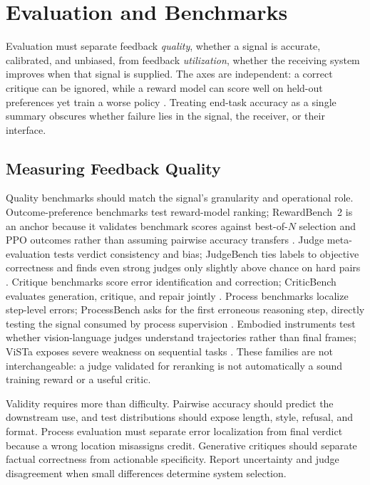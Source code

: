 \section{Evaluation and Benchmarks}
\label{sec:evaluation}

Evaluation must separate feedback \emph{quality}, whether a signal is accurate, calibrated, and unbiased, from feedback \emph{utilization}, whether the receiving system improves when that signal is supplied. The axes are independent: a correct critique can be ignored, while a reward model can score well on held-out preferences yet train a worse policy \citep{kim2024evaluating}. Treating end-task accuracy as a single summary obscures whether failure lies in the signal, the receiver, or their interface.

\subsection{Measuring Feedback Quality}
\label{subsec:eval-quality}

Quality benchmarks should match the signal's granularity and operational role. Outcome-preference benchmarks test reward-model ranking; RewardBench~2 is an anchor because it validates benchmark scores against best-of-$N$ selection and PPO outcomes rather than assuming pairwise accuracy transfers \citep{malik2025rewardbench}. Judge meta-evaluation tests verdict consistency and bias; JudgeBench ties labels to objective correctness and finds even strong judges only slightly above chance on hard pairs \citep{tan2024judgebench}. Critique benchmarks score error identification and correction; CriticBench evaluates generation, critique, and repair jointly \citep{lin2024criticbench}. Process benchmarks localize step-level errors; ProcessBench asks for the first erroneous reasoning step, directly testing the signal consumed by process supervision \citep{zheng2024processbench}. Embodied instruments test whether vision-language judges understand trajectories rather than final frames; ViSTa exposes severe weakness on sequential tasks \citep{wybitul2024vista}. These families are not interchangeable: a judge validated for reranking is not automatically a sound training reward or a useful critic.

Validity requires more than difficulty. Pairwise accuracy should predict the downstream use, and test distributions should expose length, style, refusal, and format. Process evaluation must separate error localization from final verdict because a wrong location misassigns credit. Generative critiques should separate factual correctness from actionable specificity. Report uncertainty and judge disagreement when small differences determine system selection.

